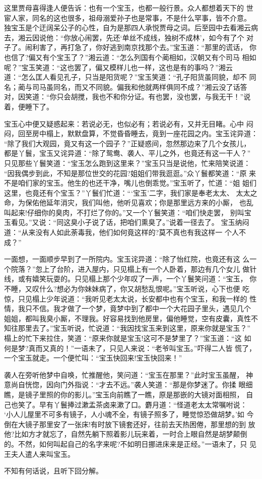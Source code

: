 这里贾母喜得逢人便告诉：也有一个宝玉，也都一般行景。众人都想着天下的
世宦人家，同名的这也很多，祖母溺爱孙子也是常事，不是什么罕事，皆不介意。
独宝玉是个迂阔呆公子的心性，自为是那四人承悦贾母之词。后至园中去看湘云病
去，湘云因说他：“你放心闹罢，先还‘单丝不成线，独树不成林’，如今有了个
对子了。闹利害了，再打急了，你好逃到南京找那个去。”宝玉道：“那里的谎话，
你也信了?偏又有个宝玉了？”湘云道：“怎么列国有个蔺相如，汉朝又有个司马
相如呢？”宝玉笑道：“这也罢了，偏又模样儿也一样，这也是有的事吗？”湘云
道：“怎么匡人看见孔子，只当是阳货呢？”宝玉笑道：“孔子阳货虽同貌，却不
同名；蔺与司马虽同名，而又不同貌。偏我和他就两样俱同不成？”湘云没了话答
对，因笑道：“你只会胡搅，我也不和你分证。有也罢，没也罢，与我无干！”说
着，便睡下了。

宝玉心中便又疑惑起来：若说必无，也似必有；若说必有，又并无目睹。心中
闷闷，回至房中榻上，默默盘算，不觉昏昏睡去，竟到一座花园之内。宝玉诧异道：
“除了我们大观园，竟又有这一个园子？”正疑惑间，忽然那边来了几个女孩儿，
都是丫鬟，宝玉又诧异道：“除了鸳鸯、袭人、平儿之外，也竟还有这一干人？”
只见那些丫鬟笑道：“宝玉怎么跑到这里来？”宝玉只当是说他，忙来陪笑说道：
“因我偶步到此，不知是那位世交的花园?姐姐们带我逛逛。”众丫鬟都笑道：“原
来不是咱们家的宝玉。他生的也还干净，嘴儿也倒乖觉。”宝玉听了，忙道：“姐
姐们这里，也竟还有个宝玉？”丫鬟们忙道：“‘宝玉’二字，我们家是奉老太太、
太太之命，为保佑他延年消灾，我们叫他，他听见喜欢；你是那里远方来的小厮，
也乱叫起来!仔细你的臭肉，不打烂了你的。”又一个丫鬟笑道：“咱们快走罢，
别叫宝玉看见。”又说：“同这臭小子说了话，把咱们熏臭了。”说着一径去了。
宝玉纳闷道：“从来没有人如此荼毒我，他们如何竟这样的?莫不真也有我这样一
个人不成？”

一面想，一面顺步早到了一所院内。宝玉诧异道：“除了怡红院，也竟还有这
么一个院落？”忽上了台阶，进入屋内，只见榻上有一个人卧着，那边有几个女儿
做针线，或有嬉笑玩耍的。只见榻上那个少年叹了一声，一个丫鬟笑问道：“宝玉，
你不睡，又叹什么?想必为你妹妹病了，你又胡愁乱恨呢。”宝玉听说，心下也便
吃惊，只见榻上少年说道：“我听见老太太说，长安都中也有个宝玉，和我一样的
性情，我只不信。我才做了一个梦，竟梦中到了都中一个大花园子里头，遇见几个
姐姐，都叫我臭小厮，不理我。好容易找到他房里，偏他睡觉，空有皮囊，真性不
知往那里去了。”宝玉听说，忙说道：“我因找宝玉来到这里，原来你就是宝玉？”
榻上的忙下来拉住，笑道：“原来你就是宝玉!这可不是梦里了？”宝玉道：“这
如何是梦?真而又真的！”一语未了，只见人来说：“老爷叫宝玉。”吓得二人皆
慌了，一个宝玉就走。一个便忙叫：“宝玉快回来!宝玉快回来！”

袭人在旁听他梦中自唤，忙推醒他，笑问道：“宝玉在那里？”此时宝玉虽醒，
神意尚自恍惚，因向门外指说：“才去不远。”袭人笑道：“那是你梦迷了。你揉
眼细瞧，是镜子里照的你的影儿。”宝玉向前瞧了一瞧，原是那嵌的大镜对面相照，
自己也笑了。早有丫鬟捧过漱盂茶卤来漱了口。麝月道：“怪道老太太常嘱咐说：
‘小人儿屋里不可多有镜子，人小魂不全，有镜子照多了，睡觉惊恐做胡梦。’如
今倒在大镜子那里安了一张床!有时放下镜套还好，往前去天热困倦，那里想的到
放他?比如方才就忘了，自然先躺下照着影儿玩来着，一时合上眼自然是胡梦颠倒
的。不然，如何叫起自己的名字来呢?不如明日挪进床来是正经。”一语未了，只
见王夫人遣人来叫宝玉。

不知有何话说，且听下回分解。